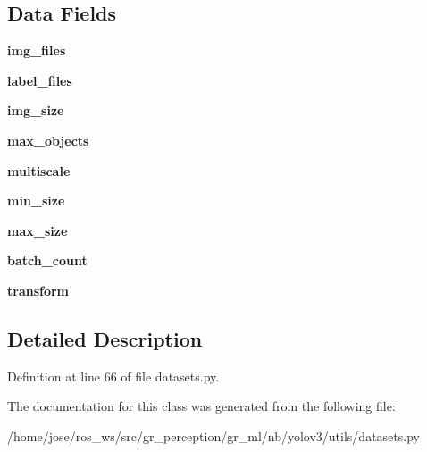 \subsection*{Data Fields}
\begin{DoxyCompactItemize}
\item 
\mbox{\label{classutils_1_1datasets_1_1ListDataset_ac1ab9d0f392e478c2645c6622e9b3a01}} 
{\bfseries img\+\_\+files}
\item 
\mbox{\label{classutils_1_1datasets_1_1ListDataset_a4876513c74d97c5fa99435d854a0de4d}} 
{\bfseries label\+\_\+files}
\item 
\mbox{\label{classutils_1_1datasets_1_1ListDataset_ae629816765b1e8eeb454fb979481c992}} 
{\bfseries img\+\_\+size}
\item 
\mbox{\label{classutils_1_1datasets_1_1ListDataset_a410a023ccb16d482b3cc05c5dabcf116}} 
{\bfseries max\+\_\+objects}
\item 
\mbox{\label{classutils_1_1datasets_1_1ListDataset_a8f7f202d7bc66ff389bf8869ba054ba1}} 
{\bfseries multiscale}
\item 
\mbox{\label{classutils_1_1datasets_1_1ListDataset_a6745840ffce86b917a140a2e37a8d4a4}} 
{\bfseries min\+\_\+size}
\item 
\mbox{\label{classutils_1_1datasets_1_1ListDataset_a84a06c16865ff17ec8cc44f2f6fd83e2}} 
{\bfseries max\+\_\+size}
\item 
\mbox{\label{classutils_1_1datasets_1_1ListDataset_ab04654b0fc8d9ec2a12e63f2fc7d23ea}} 
{\bfseries batch\+\_\+count}
\item 
\mbox{\label{classutils_1_1datasets_1_1ListDataset_ab5868b87ffa64aa73d993dc27ffd5db7}} 
{\bfseries transform}
\end{DoxyCompactItemize}


\subsection{Detailed Description}


Definition at line 66 of file datasets.\+py.



The documentation for this class was generated from the following file\+:\begin{DoxyCompactItemize}
\item 
/home/jose/ros\+\_\+ws/src/gr\+\_\+perception/gr\+\_\+ml/nb/yolov3/utils/datasets.\+py\end{DoxyCompactItemize}
